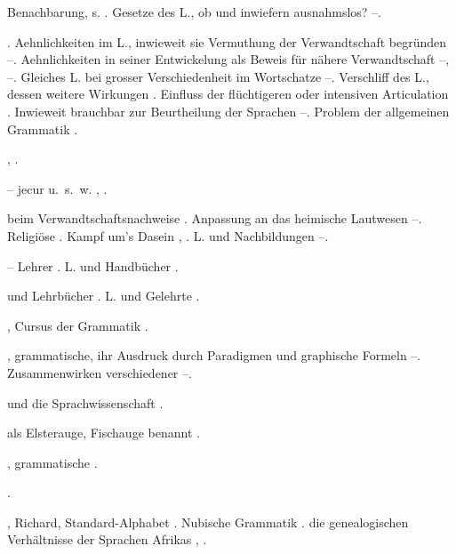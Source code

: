 \begin{register}
  Benachbarung, s. . Gesetze des L., ob und inwiefern ausnahmslos? \pageref{sp.185}–\pageref{sp.196}.

. Aehnlichkeiten im L., inwieweit sie Vermuthung der Verwandtschaft begründen \pageref{sp.148}–\pageref{sp.149}. Aehnlichkeiten in seiner Entwickelung als Beweis für nähere Verwandtschaft \pageref{sp.159}–\pageref{sp.160}, \pageref{sp.164}–\pageref{sp.165}. Gleiches L. bei grosser Verschiedenheit im Wortschatze \pageref{sp.165}–\pageref{sp.166}. Verschliff des L., dessen weitere Wirkungen \pageref{sp.178}. Einfluss der flüchtigeren oder intensiven Articulation \pageref{sp.183}. Inwieweit brauchbar zur Beurtheilung der Sprachen \pageref{sp.431}–\pageref{sp.432}. Problem der allgemeinen Grammatik \pageref{sp.479}.


 \pageref{sp.98}, \pageref{sp.105}.

 – jecur u.~s.~w. \pageref{sp.192}, \pageref{sp.217}.

 beim Verwandtschaftsnachweise \pageref{sp.154}. Anpassung an das heimische Lautwesen \pageref{sp.186}–\pageref{sp.187}.  Religiöse \pageref{sp.231}. Kampf um’s Dasein \pageref{sp.238}, \pageref{sp.262}. L. und Nachbildungen \pageref{sp.261}–\pageref{sp.268}.

 – Lehrer \pageref{sp.71}. L. und Handbücher \pageref{sp.111}.

 und Lehrbücher \pageref{sp.71}. L. und Gelehrte \pageref{sp.110}.

, Cursus der Grammatik \pageref{sp.111}.

, grammatische, ihr Ausdruck durch Paradigmen und graphische Formeln \pageref{sp.116}–\pageref{sp.119}. Zusammenwirken verschiedener \pageref{sp.118}–\pageref{sp.119}.

 und die Sprachwissenschaft \pageref{sp.27}.

 als  Elsterauge, Fischauge benannt \pageref{sp.41}.

, grammatische \pageref{sp.109}.

 \pageref{sp.163}.

, Richard, Standard-Alphabet \pageref{sp.38}\sed{, \pageref{sp.69}}. Nubische Grammatik \pageref{sp.161}.  die genealogischen Verhältnisse der Sprachen Afrikas \pageref{sp.282}, \pageref{sp.406}.


\end{register}
